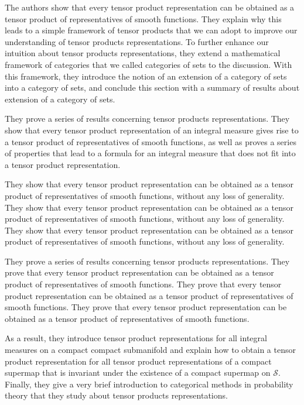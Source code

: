 \documentclass[a4paper,reqno,oneside]{article}
\begin{document}
The authors show that every tensor product representation can be obtained as a tensor product of representatives of smooth functions. They explain why this leads to a simple framework of tensor products that we can adopt to improve our understanding of tensor products representations. To further enhance our intuition about tensor products representations, they extend a mathematical framework of categories that we called categories of sets to the discussion. With this framework, they introduce the notion of an extension of a category of sets into a category of sets, and conclude this section with a summary of results about extension of a category of sets. 

They prove a series of results concerning tensor products representations. They show that every tensor product representation of an integral measure gives rise to a tensor product of representatives of smooth functions, as well as proves a series of properties that lead to a formula for an integral measure that does not fit into a tensor product representation.

They show that every tensor product representation can be obtained as a tensor product of representatives of smooth functions, without any loss of generality. They show that every tensor product representation can be obtained as a tensor product of representatives of smooth functions, without any loss of generality. They show that every tensor product representation can be obtained as a tensor product of representatives of smooth functions, without any loss of generality.

They prove a series of results concerning tensor products representations. They prove that every tensor product representation can be obtained as a tensor product of representatives of smooth functions. They prove that every tensor product representation can be obtained as a tensor product of representatives of smooth functions. They prove that every tensor product representation can be obtained as a tensor product of representatives of smooth functions.

As a result, they introduce tensor product representations for all integral measures on a compact compact submanifold and explain how to obtain a tensor product representation for all tensor product representations of a compact supermap that is invariant under the existence of a compact supermap on $\mathcal{S}$. Finally, they give a very brief introduction to categorical methods in probability theory that they study about tensor products representations. 
\end{document}
